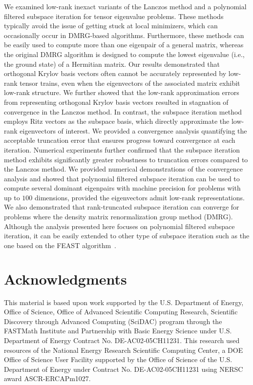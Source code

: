 \documentclass[10pt,preprint]{elsarticle}
\begin{document}
We examined low-rank inexact variants of the Lanczos method and a polynomial filtered subspace iteration for tensor eigenvalue problems. These methods typically avoid the issue of getting stuck at local minimizers, which can occasionally occur in DMRG-based algorithms. Furthermore, these methods can be easily used to compute more than one eigenpair of a general matrix, whereas the original DMRG algorithm is designed to compute the lowest eigenvalue (i.e., the ground state) of a Hermitian matrix. 
%
Our results demonstrated that orthogonal Krylov basis vectors often cannot be accurately represented by low-rank tensor trains, even when the eigenvectors of the associated matrix exhibit low-rank structure. We further showed that the low-rank approximation errors from representing orthogonal Krylov basis vectors resulted in stagnation of convergence in the Lanczos method. 
%
In contrast, the subspace iteration method employs Ritz vectors as the subspace basis, which directly approximate the low-rank eigenvectors of interest. We provided a convergence analysis quantifying the acceptable truncation error that ensures progress toward convergence at each iteration. Numerical experiments further confirmed that the subspace iteration method exhibits significantly greater robustness to truncation errors compared to the Lanczos method. We provided numerical demonstrations of the convergence analysis and showed that polynomial filtered subspace iteration can be used to compute several dominant eigenpairs with machine precision for problems with up to $100$ dimensions, provided the eigenvectors admit low-rank representations. We also demonstrated that rank-truncated subspace iteration can converge for problems where the density matrix renormalization group method (DMRG). Although the analysis presented here focuses on polynomial filtered subspace iteration, it can be easily extended to other type of subspace iteration such as the one based on the FEAST algorithm~\cite{DMRGFEAST}. 

\section*{Acknowledgments}
This material is based upon work supported by the U.S. Department of Energy, Office of Science, Office of Advanced Scientific Computing Research, Scientific Discovery through Advanced Computing (SciDAC) program through the FASTMath Institute and Partnership with Basic Energy Science under U.S. Department of Energy Contract No. DE-AC02-05CH11231.  This research used resources of the National Energy Research Scientific Computing Center, a DOE Office of Science User Facility supported by the Office of Science of the U.S. Department of Energy under Contract No. DE-AC02-05CH11231 using NERSC award ASCR-ERCAPm1027.
\end{document}
